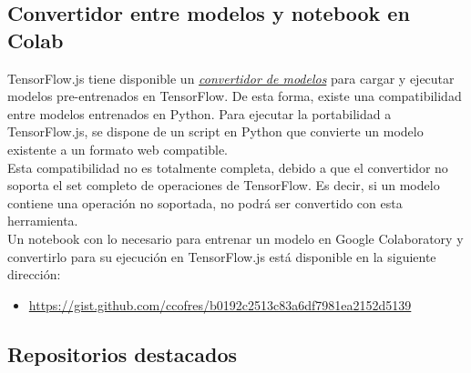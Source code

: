 \subsection{Convertidor entre modelos y notebook en Colab}

TensorFlow.js tiene disponible un \href{https://github.com/tensorflow/tfjs/tree/master/tfjs-converter}{\emph{convertidor de modelos}} \cite{TensorflowTfjs}
 para cargar y ejecutar modelos pre-entrenados en TensorFlow.
De esta forma, existe una compatibilidad entre modelos entrenados en Python.
Para ejecutar la portabilidad a TensorFlow.js, se dispone de un script en Python que convierte un modelo existente a un formato web compatible.\\
Esta compatibilidad no es totalmente completa, debido a que el convertidor no soporta el set completo de operaciones de
TensorFlow. Es decir, si un modelo contiene una operación no soportada, no podrá ser convertido con esta herramienta.\\
Un notebook con lo necesario para entrenar un modelo en Google Colaboratory y convertirlo para su ejecución en TensorFlow.js está disponible en la siguiente dirección:
\begin{itemize}
    \item \url{https://gist.github.com/ccofres/b0192c2513c83a6df7981ea2152d5139}
\end{itemize}






\subsection{Repositorios destacados}

